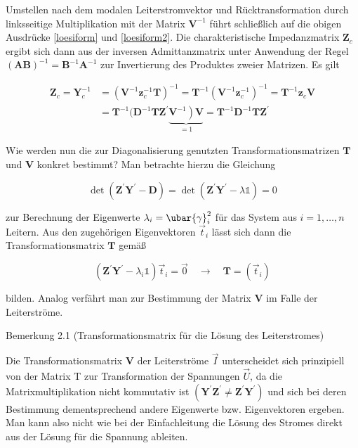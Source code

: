 Umstellen nach dem modalen Leiterstromvektor und Rücktransformation durch linksseitige Multiplikation mit der Matrix $\mathbf{V}^{-1}$ führt schließlich auf die obigen Ausdrücke \ref{loesiform} und \ref{loesiform2}. Die charakteristische Impedanzmatrix $\mathbf{Z}_{c}$ ergibt sich dann aus der inversen Admittanzmatrix unter Anwendung der Regel $(\mathbf{A B})^{-1}=\mathbf{B}^{-1} \mathbf{A}^{-1}$ zur Invertierung des Produktes zweier Matrizen. Es gilt


\begin{align}
	\mathbf{Z}_{c}=\mathbf{Y}_{c}^{-1} & =\left(\mathbf{V}^{-1} \mathbf{z}_{c}^{-1} \mathbf{T}\right)^{-1}=\mathbf{T}^{-1}\left(\mathbf{V}^{-1} \mathbf{z}_{c}^{-1}\right)^{-1}=\mathbf{T}^{-1} \mathbf{z}_{c} \mathbf{V}  \\
	& =\mathbf{T}^{-1}(\mathbf{D}^{-1} \mathbf{T} \mathbf{Z}^{\prime} \underbrace{\left.\mathbf{V}^{-1}\right) \mathbf{V}}_{=1}=\mathbf{T}^{-1} \mathbf{D}^{-1} \mathbf{T} \mathbf{Z}^{\prime} 
\end{align}


Wie werden nun die zur Diagonalisierung genutzten Transformationsmatrizen $\mathbf{T}$ und $\mathbf{V}$ konkret bestimmt? Man betrachte hierzu die Gleichung


\begin{equation}
	\operatorname{det}\left(\mathbf{Z}^{\prime} \mathbf{Y}^{\prime}-\mathbf{D}\right)=\operatorname{det}\left(\mathbf{Z}^{\prime} \mathbf{Y}^{\prime}-\lambda \mathbb{1}\right)=0 
\end{equation}


zur Berechnung der Eigenwerte $\lambda_{i}=\ubar{\gamma}_{i}^{2}$ für das System aus $i=1, \ldots, n$ Leitern. Aus den zugehörigen Eigenvektoren $\vec{t}_{i}$ lässt sich dann die Transformationsmatrix $\mathbf{T}$ gemäß


\begin{equation}
	\left(\mathbf{Z}^{\prime} \mathbf{Y}^{\prime}-\lambda_{i} \mathbb{1}\right) \vec{t}_{i}=\overrightarrow{0} \quad \rightarrow \quad \mathbf{T}=\left(\vec{t}_{i}\right) 
\end{equation}


bilden. Analog verfährt man zur Bestimmung der Matrix $\mathbf{V}$ im Falle der Leiterströme.

Bemerkung 2.1 (Transformationsmatrix für die Lösung des Leiterstromes)

Die Transformationsmatrix $\mathbf{V}$ der Leiterströme $\vec{I}$ unterscheidet sich prinzipiell von der Matrix T zur Transformation der Spannungen $\vec{U}$, da die Matrixmultiplikation nicht kommutativ ist $\left(\mathbf{Y}^{\prime} \mathbf{Z}^{\prime} \neq \mathbf{Z}^{\prime} \mathbf{Y}^{\prime}\right)$ und sich bei deren Bestimmung dementsprechend andere Eigenwerte bzw. Eigenvektoren ergeben. Man kann also nicht wie bei der Einfachleitung die Lösung des Stromes direkt aus der Lösung für die Spannung ableiten.

